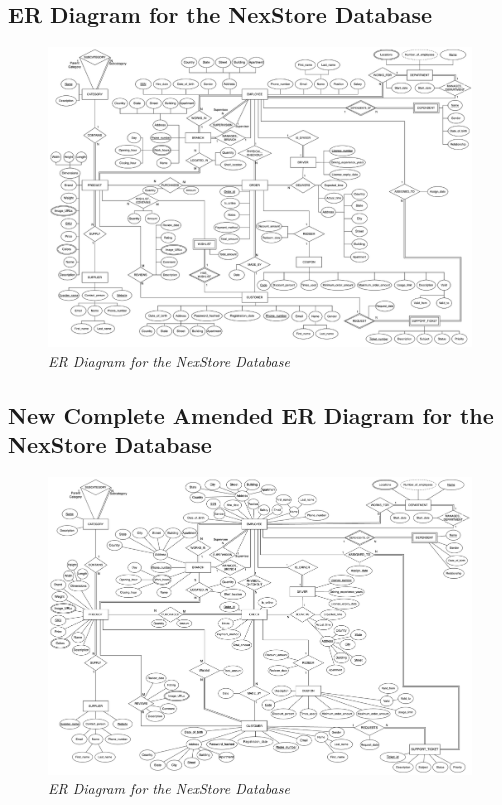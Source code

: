 \documentclass[11pt]{article}
\begin{document}
\begin{landscape}
  \section{ER Diagram for the NexStore Database}
  \begin{figure}[H]
    \centering
    \includegraphics[width=1\textwidth]{images/diagrams/old-diagram.drawio.png}
    \caption{\textit{ER Diagram for the NexStore Database}}
  \end{figure}
\end{landscape}

\begin{landscape}
  \section{New Complete Amended ER Diagram for the NexStore Database}
  \begin{figure}[H]
    \centering
    \includegraphics[width=1\textwidth]{images/diagrams/diagram.drawio.png}
    \caption{\textit{ER Diagram for the NexStore Database}}
  \end{figure}
\end{landscape}
\end{document}
